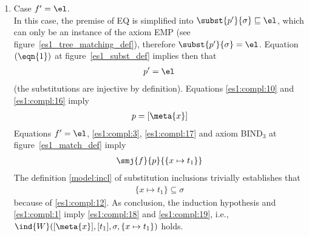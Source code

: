 \begin{enumerate}
\begin{enumerate}
\begin{enumerate}
          \item Case \(f' = \el\).\\ In this case, the premise of
            \textsf{EQ} is simplified into
            \(\subst{{p}'}{\sigma} \sqsubseteq \el\), which
            can only be an instance of the axiom \textsf{EMP} (see
            figure~\ref{es1_tree_matching_def}), therefore
            \(\subst{{p}'}{\sigma} = \el\). Equation
            \((\eqn{1})\) at figure~\ref{es1_subst_def} implies then
            that
            \begin{gather}
              {p}' = \el \label{es1:compl:16}
            \end{gather}
            (the substitutions are injective by definition). Equations
            \eqref{es1:compl:10} and \eqref{es1:compl:16} imply
            \begin{gather}
              {p} = [\meta{x}] \label{es1:compl:17}
            \end{gather}
            Equations \(f' = \el\), \eqref{es1:compl:3},
            \eqref{es1:compl:17} and axiom \textsf{BIND}\(_3\) at
            figure~\ref{es1_match_def} imply
            \begin{gather}
              \smj{f}{{p}}{\{x \mapsto t_1\}} \label{es1:compl:18}
            \end{gather}
            The definition \eqref{model:incl} of substitution
            inclusions trivially establishes that
            \begin{gather}
              \{x \mapsto t_1\} \subseteq \sigma \label{es1:compl:19}
            \end{gather}
            because of \eqref{es1:compl:12}. As conclusion, the
            induction hypothesis and \eqref{es1:compl:1} imply
            \eqref{es1:compl:18} and \eqref{es1:compl:19}, i.e.,
            \(\ind{W}([\meta{x}], [t_1], \sigma, \{x \mapsto t_1\})\)
            holds.


\end{enumerate}
\end{enumerate}
\end{enumerate}

